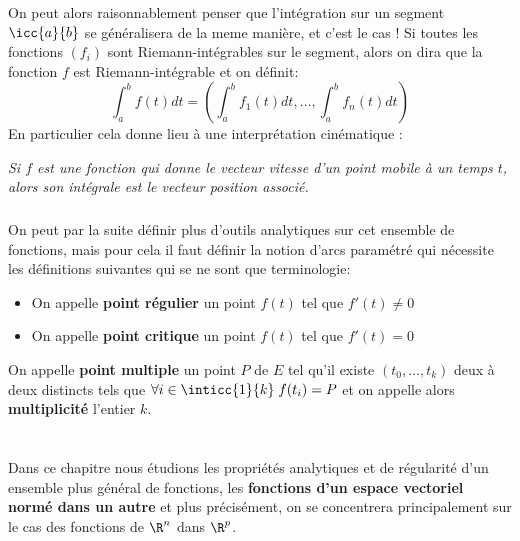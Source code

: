 \subsection*{}
On peut alors raisonnablement penser que l'intégration sur un segment \(\icc{a}{b}\) se généralisera de la meme manière, et c'est le cas ! Si toutes les fonctions \((f_i)\) sont Riemann-intégrables sur le segment, alors on dira que la fonction \(f\) est Riemann-intégrable et on définit:
\[
   \int_{a}^{b} f(t) d t = \left(\int_{a}^{b} f_1(t) d t, \ldots, \int_{a}^{b} f_n(t) d t\right)   
\]
En particulier cela donne lieu à une interprétation cinématique :
\begin{center}
   \textit{Si \(f\) est une fonction qui donne le vecteur vitesse d'un point mobile à un temps \(t\), alors son intégrale est le vecteur position associé.}
\end{center}
\subsection*{}
On peut par la suite définir plus d'outils analytiques sur cet ensemble de fonctions, mais pour cela il faut définir la notion d'arcs paramétré qui nécessite les définitions suivantes qui se ne sont que terminologie:
\begin{itemize}
   \item On appelle \textbf{point régulier} un point \(f(t)\) tel que \(f'(t) \neq 0\)
   \item On appelle \textbf{point critique} un point \(f(t)\) tel que \(f'(t) = 0\)
\end{itemize}
On appelle \textbf{point multiple} un point \(P\) de \(E\) tel qu'il existe \((t_0, \ldots, t_k)\) deux à deux distincts tels que \(\forall i \in \inticc{1}{k} \; f(t_i) = P\) et on appelle alors \textbf{multiplicité} l'entier \(k\).
\chapter*{}

Dans ce chapitre nous étudions les propriétés analytiques et de régularité d'un ensemble plus général de fonctions, les \textbf{fonctions d'un espace vectoriel normé dans un autre} et plus précisément, on se concentrera principalement sur le cas des fonctions de \(\R^n\) dans \(\R^p\).\<

